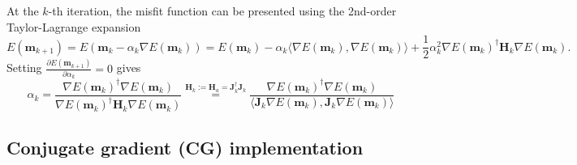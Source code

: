 At the $k$-th iteration, the misfit function can be presented using the 2nd-order Taylor-Lagrange expansion
\begin{equation}
E(\textbf{m}_{k+1})=E(\textbf{m}_k-\alpha_k \nabla E(\textbf{m}_k))=E(\textbf{m}_k)-\alpha_k \langle\nabla E(\textbf{m}_k),\nabla E(\textbf{m}_k)\rangle+\frac{1}{2}\alpha_k^2\nabla E(\textbf{m}_k)^{\dagger}\textbf{H}_k\nabla E(\textbf{m}_k).
\end{equation}
Setting $\frac{\partial E(\textbf{m}_{k+1})}{\partial \alpha_k}=0$ gives
\begin{equation}
\alpha_k=\frac{\nabla E(\textbf{m}_k)^{\dagger}\nabla E(\textbf{m}_k)}{\nabla E(\textbf{m}_k)^{\dagger}\textbf{H}_k\nabla E(\textbf{m}_k)}
\overset{\textbf{H}_k:=\textbf{H}_a=\textbf{J}_k^{\dagger}\textbf{J}_k}{=}
\frac{\nabla E(\textbf{m}_k)^{\dagger}\nabla E(\textbf{m}_k)}{ \langle\textbf{J}_k\nabla E(\textbf{m}_k),\textbf{J}_k\nabla E(\textbf{m}_k)\rangle}
\end{equation}


\subsection{Conjugate gradient (CG) implementation}

